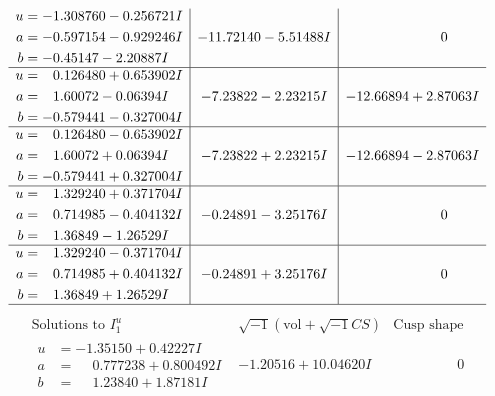 \documentclass[1p]{elsarticle_modified}
\theoremstyle{definition}
\newcommand{\I}{\sqrt{-1}}
\begin{document}
$$\begin{array}{c|c|c}
\begin{aligned}
u &= -1.308760 - 0.256721 I \\
a &= -0.597154 - 0.929246 I \\
b &= -0.45147 - 2.20887 I\end{aligned}
 & -11.72140 - 5.51488 I & \phantom{-0.000000 } 0 \\ \hline\begin{aligned}
u &= \phantom{-}0.126480 + 0.653902 I \\
a &= \phantom{-}1.60072 - 0.06394 I \\
b &= -0.579441 - 0.327004 I\end{aligned}
 & -7.23822 - 2.23215 I & -12.66894 + 2.87063 I \\ \hline\begin{aligned}
u &= \phantom{-}0.126480 - 0.653902 I \\
a &= \phantom{-}1.60072 + 0.06394 I \\
b &= -0.579441 + 0.327004 I\end{aligned}
 & -7.23822 + 2.23215 I & -12.66894 - 2.87063 I \\ \hline\begin{aligned}
u &= \phantom{-}1.329240 + 0.371704 I \\
a &= \phantom{-}0.714985 - 0.404132 I \\
b &= \phantom{-}1.36849 - 1.26529 I\end{aligned}
 & -0.24891 - 3.25176 I & \phantom{-0.000000 } 0 \\ \hline\begin{aligned}
u &= \phantom{-}1.329240 - 0.371704 I \\
a &= \phantom{-}0.714985 + 0.404132 I \\
b &= \phantom{-}1.36849 + 1.26529 I\end{aligned}
 & -0.24891 + 3.25176 I & \phantom{-0.000000 } 0\\
 \hline 
 \end{array}$$\newpage$$\begin{array}{c|c|c}  
\text{Solutions to }I^u_{1}& \I (\text{vol} + \sqrt{-1}CS) & \text{Cusp shape}\\
 \hline 
\begin{aligned}
u &= -1.35150 + 0.42227 I \\
a &= \phantom{-}0.777238 + 0.800492 I \\
b &= \phantom{-}1.23840 + 1.87181 I\end{aligned}
 & -1.20516 + 10.04620 I & \phantom{-0.000000 } 0 \\ \hline\begin{aligned}

\end{aligned}
\end{array}$$
\end{document}
